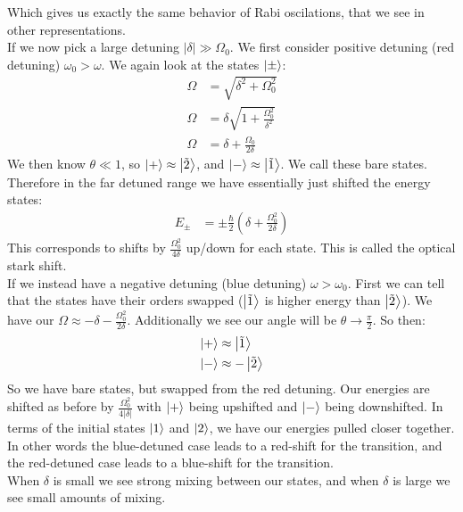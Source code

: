 Which gives us exactly the same behavior of Rabi oscilations, that we see in other representations.\\
If we now pick a large detuning $|\delta| \gg \Omega_0$. We first consider positive detuning (red detuning) $\omega_0 > \omega$. We again look at the states $\ket{\pm}$:
\begin{align*}
	\Omega &= \sqrt{\delta^2 + \Omega_0^2} \\
	\Omega &= \delta\sqrt{1 + \frac{\Omega_0^2}{\delta^2}} \\
	\Omega &= \delta + \frac{\Omega_0}{2\delta}
\end{align*}
We then know $\theta\ll 1$, so $\ket{+} \approx \ket{\tilde{2}}$, and $\ket{-} \approx \ket{\tilde{1}}$. We call these bare states. Therefore in the far detuned range we have essentially just shifted the energy states:
\begin{align*}
	E_\pm &= \pm \frac{\hbar}{2}\left(\delta + \frac{\Omega_0^2}{2\delta}\right) 
\end{align*}
This corresponds to shifts by $\frac{\Omega_0^2}{4\delta}$ up/down for each state. This is called the optical stark shift. \\
If we instead have a negative detuning (blue detuning) $\omega > \omega_0$. First we can tell that the states have their orders swapped ($\ket{\tilde{1}}$ is higher energy than $\ket{\tilde{2}}$). 
We have our $\Omega \approx -\delta -\frac{\Omega_0^2}{2\delta}$. Additionally we see our angle will be $\theta \to \frac{\pi}{2}$. So then:
\begin{align*}
	\ket{+} &\approx \ket{\tilde{1}} \\
	\ket{-} &\approx -\ket{\tilde{2}} \\
\end{align*}
So we have bare states, but swapped from the red detuning. Our energies are shifted as before by $\frac{\Omega_0^2}{4|\delta|}$ with $\ket{+}$ being upshifted and $\ket{-}$ being downshifted. In terms of the initial states $\ket{1}$ and $\ket{2}$, we have our energies pulled closer together. In other words the blue-detuned case leads to a red-shift for the transition, and the red-detuned case leads to a blue-shift for the transition. \\
When $\delta$ is small we see strong mixing between our states, and when $\delta$ is large we see small amounts of mixing. \\
